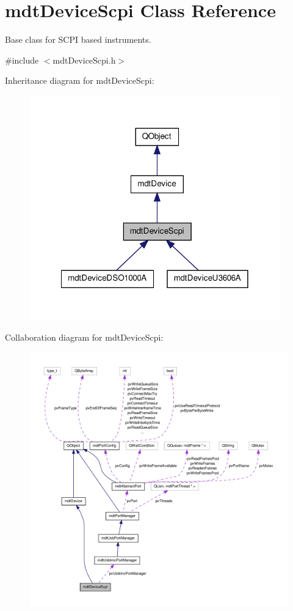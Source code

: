 \hypertarget{classmdt_device_scpi}{\section{mdt\-Device\-Scpi Class Reference}
\label{classmdt_device_scpi}
}


Base class for S\-C\-P\-I based instruments.  




{\ttfamily \#include $<$mdt\-Device\-Scpi.\-h$>$}



Inheritance diagram for mdt\-Device\-Scpi\-:\nopagebreak
\begin{figure}[H]
\begin{center}
\leavevmode
\includegraphics[width=308pt]{classmdt_device_scpi__inherit__graph}
\end{center}
\end{figure}


Collaboration diagram for mdt\-Device\-Scpi\-:\nopagebreak
\begin{figure}[H]
\begin{center}
\leavevmode
\includegraphics[width=350pt]{classmdt_device_scpi__coll__graph}
\end{center}
\end{figure}
